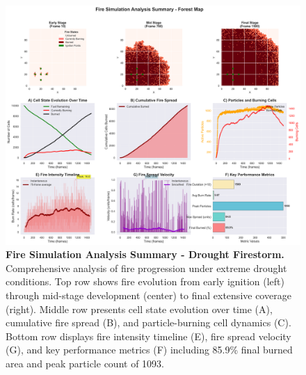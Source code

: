 \begin{figure}[H]
	\centering
	\includegraphics[width=\textwidth]{media/report_summary_df.png}
	\caption{
		\textbf{Fire Simulation Analysis Summary - Drought Firestorm.} 
		Comprehensive analysis of fire progression under extreme drought conditions. Top row shows fire evolution from early ignition (left) through mid-stage development (center) to final extensive coverage (right). Middle row presents cell state evolution over time (A), cumulative fire spread (B), and particle-burning cell dynamics (C). Bottom row displays fire intensity timeline (E), fire spread velocity (G), and key performance metrics (F) including 85.9\% final burned area and peak particle count of 1093.
	}
	\label{fig:res_df}
\end{figure}

